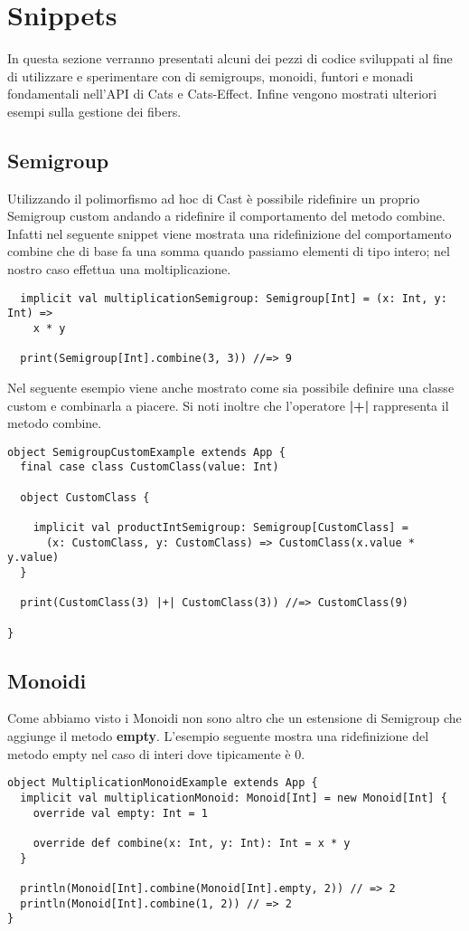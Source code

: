 \chapter{Snippets}
In questa sezione verranno presentati alcuni dei pezzi di codice sviluppati al fine di utilizzare e sperimentare con di semigroups, monoidi, funtori e monadi fondamentali nell’API di Cats e Cats-Effect. Infine vengono mostrati ulteriori esempi sulla gestione dei fibers.

\section{Semigroup}
Utilizzando il polimorfismo ad hoc di Cast è possibile ridefinire un proprio Semigroup custom andando a ridefinire il comportamento del metodo combine. Infatti nel seguente snippet viene  mostrata una ridefinizione del comportamento combine che di base fa una somma quando passiamo elementi di tipo intero; nel nostro caso effettua una moltiplicazione.
\begin{verbatim}
  implicit val multiplicationSemigroup: Semigroup[Int] = (x: Int, y: Int) =>
    x * y

  print(Semigroup[Int].combine(3, 3)) //=> 9
\end{verbatim}

\noindent Nel seguente esempio viene anche mostrato come sia possibile definire una classe custom e combinarla a piacere. Si noti inoltre che l'operatore \textbf{|+|} rappresenta il metodo combine.
\begin{verbatim}
object SemigroupCustomExample extends App {
  final case class CustomClass(value: Int)

  object CustomClass {

    implicit val productIntSemigroup: Semigroup[CustomClass] =
      (x: CustomClass, y: CustomClass) => CustomClass(x.value * y.value)
  }
  
  print(CustomClass(3) |+| CustomClass(3)) //=> CustomClass(9)

}
\end{verbatim}

\section{Monoidi}
Come abbiamo visto i Monoidi non sono altro che un estensione di Semigroup che aggiunge il metodo \textbf{empty}. L'esempio seguente mostra una ridefinizione del metodo empty nel caso di interi dove tipicamente è 0. 
\begin{verbatim}
object MultiplicationMonoidExample extends App {
  implicit val multiplicationMonoid: Monoid[Int] = new Monoid[Int] {
    override val empty: Int = 1

    override def combine(x: Int, y: Int): Int = x * y
  }

  println(Monoid[Int].combine(Monoid[Int].empty, 2)) // => 2
  println(Monoid[Int].combine(1, 2)) // => 2
}
\end{verbatim}

